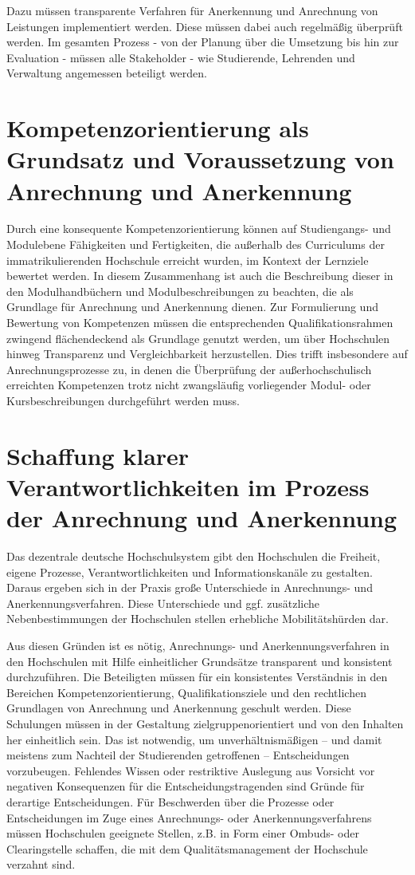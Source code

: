 \documentclass[DIV=calc]{scrartcl}
\begin{document}
Dazu müssen transparente Verfahren für Anerkennung und Anrechnung von Leistungen implementiert werden. Diese müssen dabei auch regelmäßig überprüft werden. Im gesamten Prozess - von der Planung über die Umsetzung bis hin zur Evaluation - müssen alle Stakeholder - wie Studierende, Lehrenden und Verwaltung angemessen beteiligt werden.

\section*{Kompetenzorientierung als Grundsatz und Voraussetzung von Anrechnung und Anerkennung}
Durch eine konsequente Kompetenzorientierung können auf Studiengangs- und Modulebene Fähigkeiten und Fertigkeiten, die außerhalb des Curriculums der immatrikulierenden Hochschule erreicht wurden, im Kontext der Lernziele bewertet werden. In diesem Zusammenhang ist auch die Beschreibung dieser in den Modulhandbüchern und Modulbeschreibungen zu beachten, die als Grundlage für Anrechnung und Anerkennung dienen. Zur Formulierung und Bewertung von Kompetenzen müssen die entsprechenden Qualifikationsrahmen zwingend flächendeckend als Grundlage genutzt werden, um über Hochschulen hinweg Transparenz und Vergleichbarkeit herzustellen. Dies trifft insbesondere auf Anrechnungsprozesse zu, in denen die Überprüfung der außerhochschulisch erreichten Kompetenzen trotz nicht zwangsläufig vorliegender Modul- oder Kursbeschreibungen durchgeführt werden muss.

\section*{Schaffung klarer Verantwortlichkeiten im Prozess der Anrechnung und Anerkennung}

Das dezentrale deutsche Hochschulsystem gibt den Hochschulen die Freiheit, eigene Prozesse, Verantwortlichkeiten und Informationskanäle zu gestalten. Daraus ergeben sich in der Praxis große Unterschiede in Anrechnungs- und Anerkennungsverfahren. Diese Unterschiede und ggf. zusätzliche Nebenbestimmungen der Hochschulen stellen erhebliche Mobilitätshürden dar.

Aus diesen Gründen ist es nötig, Anrechnungs- und Anerkennungsverfahren in den Hochschulen mit Hilfe einheitlicher Grundsätze transparent und konsistent durchzuführen. Die Beteiligten müssen für ein konsistentes Verständnis in den Bereichen Kompetenzorientierung, Qualifikationsziele und den rechtlichen Grundlagen von Anrechnung und Anerkennung geschult werden. Diese Schulungen müssen in der Gestaltung zielgruppenorientiert und von den Inhalten her einheitlich sein. Das ist notwendig, um unverhältnismäßigen – und damit meistens zum Nachteil der Studierenden getroffenen – Entscheidungen vorzubeugen. Fehlendes Wissen oder restriktive Auslegung aus Vorsicht vor negativen Konsequenzen für die Entscheidungstragenden sind Gründe für derartige Entscheidungen. Für Beschwerden über die Prozesse oder Entscheidungen im Zuge eines Anrechnungs- oder Anerkennungsverfahrens müssen Hochschulen geeignete Stellen, z.B. in Form einer Ombuds- oder Clearingstelle schaffen, die mit dem Qualitätsmanagement der Hochschule verzahnt sind.
\end{document}
